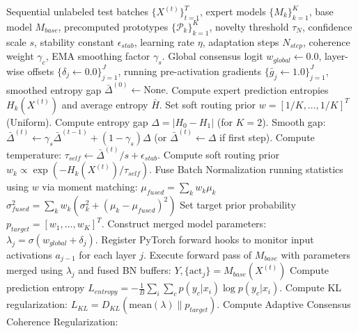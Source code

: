 \documentclass{article}
\theoremstyle{plain}
\theoremstyle{definition}
\theoremstyle{remark}
\begin{document}
\begin{algorithm*}[t]
   \caption{BK-CoMerge: Bayesian Kronecker-Preconditioned Co-acting Test-Time Model Merging}
   \label{alg:bk_comerge}
\begin{algorithmic}[1]
    Sequential unlabeled test batches $\{X^{(t)}\}_{t=1}^T$, expert models $\{M_k\}_{k=1}^K$, base model $M_{base}$, precomputed prototypes $\{\mathcal{P}_k\}_{k=1}^K$, novelty threshold $\tau_N$, confidence scale $s$, stability constant $\epsilon_{stab}$, learning rate $\eta$, adaptation steps $N_{step}$, coherence weight $\gamma_c$, EMA smoothing factor $\gamma_s$.
    Global consensus logit $w_{global} \leftarrow 0.0$, layer-wise offsets $\{\delta_j \leftarrow 0.0\}_{j=1}^J$, running pre-activation gradients $\{\bar{g}_j \leftarrow 1.0\}_{j=1}^J$, smoothed entropy gap $\bar{\Delta}^{(0)} \leftarrow \text{None}$.
       \STATE Compute expert prediction entropies $H_k(X^{(t)})$ and average entropy $\bar{H}$.
           \STATE Set soft routing prior $w = [1/K, \dots, 1/K]^T$ (Uniform).
       \ELSE
           \STATE Compute entropy gap $\Delta = |H_0 - H_1|$ (for $K=2$).
           \STATE Smooth gap: $\bar{\Delta}^{(t)} \leftarrow \gamma_s \bar{\Delta}^{(t-1)} + (1-\gamma_s)\Delta$ (or $\bar{\Delta}^{(t)} \leftarrow \Delta$ if first step).
           \STATE Compute temperature: $\tau_{self} \leftarrow \bar{\Delta}^{(t)} / s + \epsilon_{stab}$.
           \STATE Compute soft routing prior $w_k \propto \exp(-H_k(X^{(t)}) / \tau_{self})$.
       \ENDIF
       \STATE Fuse Batch Normalization running statistics using $w$ via moment matching:
       \STATE \quad $\mu_{fused} = \sum_k w_k \mu_k$
       \STATE \quad $\sigma_{fused}^2 = \sum_k w_k (\sigma_k^2 + (\mu_k - \mu_{fused})^2)$
       \STATE Set target prior probability $p_{target} = [w_1, \dots, w_K]^T$.
           \STATE Construct merged model parameters: $\lambda_j = \sigma(w_{global} + \delta_j)$.
           \STATE Register PyTorch forward hooks to monitor input activations $a_{j-1}$ for each layer $j$.
           \STATE Execute forward pass of $M_{base}$ with parameters merged using $\lambda_j$ and fused BN buffers:
           \STATE \quad $Y, \{\text{act}_j\} = M_{base}(X^{(t)})$
           \STATE Compute prediction entropy $L_{entropy} = -\frac{1}{B}\sum_i \sum_c p(y_c|x_i)\log p(y_c|x_i)$.
           \STATE Compute KL regularization: $L_{KL} = D_{KL}(\text{mean}(\lambda) \| p_{target})$.
           \STATE Compute Adaptive Consensus Coherence Regularization:

\end{algorithmic}
\end{algorithm*}
\end{document}
